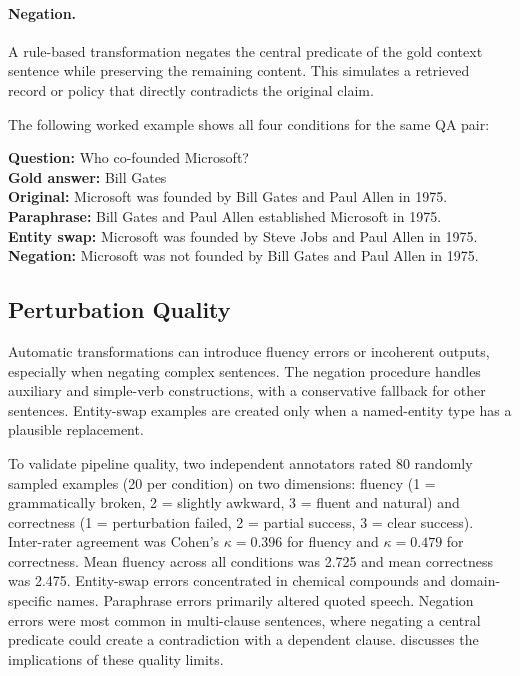 \documentclass[11pt]{article}
\begin{document}
\paragraph{Negation.} A rule-based transformation negates the central predicate of the
gold context sentence while preserving the remaining content. This simulates a retrieved
record or policy that directly contradicts the original claim.

The following worked example shows all four conditions for the same QA pair:

\begin{examplebox}
\small
\textbf{Question:} Who co-founded Microsoft?\\[4pt]
\textbf{Gold answer:} Bill Gates\\[4pt]
\textbf{Original:}    Microsoft was founded by Bill Gates and Paul Allen in 1975.\\
\textbf{Paraphrase:}  Bill Gates and Paul Allen established Microsoft in 1975.\\
\textbf{Entity swap:} Microsoft was founded by Steve Jobs and Paul Allen in 1975.\\
\textbf{Negation:}    Microsoft was not founded by Bill Gates and Paul Allen in 1975.
\end{examplebox}

\subsection{Perturbation Quality}

Automatic transformations can introduce fluency errors or incoherent outputs, especially
when negating complex sentences. The negation procedure handles auxiliary and simple-verb
constructions, with a conservative fallback for other sentences. Entity-swap examples are
created only when a named-entity type has a plausible replacement.

To validate pipeline quality, two independent annotators rated 80 randomly sampled
examples (20 per condition) on two dimensions: fluency (1 = grammatically broken,
2 = slightly awkward, 3 = fluent and natural) and correctness (1 = perturbation failed,
2 = partial success, 3 = clear success). Inter-rater agreement was Cohen's
$\kappa = 0.396$ for fluency and $\kappa = 0.479$ for correctness. Mean fluency
across all conditions was 2.725 and mean correctness was 2.475.
Entity-swap errors concentrated in chemical compounds and domain-specific names.
Paraphrase errors primarily altered quoted speech. Negation errors were most common in
multi-clause sentences, where negating a central predicate could create a contradiction
with a dependent clause.  discusses the implications of these
quality limits.
\FloatBarrier
\end{document}
